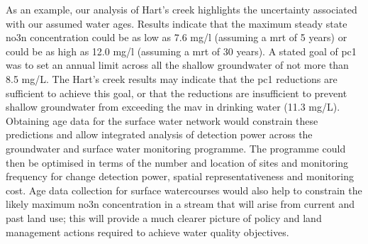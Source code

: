 As an example, our analysis of Hart's creek highlights the uncertainty associated with our assumed water ages.
Results indicate that the maximum steady state \gls{no3n} concentration could be as low as 7.6 mg/l (assuming a \gls{mrt} of 5 years) or could be as high as 12.0 mg/l (assuming a \gls{mrt} of 30 years).
A stated goal of \gls{pc1} was to set an annual limit across all the shallow groundwater of not more than 8.5 mg/L.
The Hart's creek results may indicate that the \gls{pc1} reductions are sufficient to achieve this goal, or that the reductions are insufficient to prevent shallow groundwater from exceeding the \gls{mav} in drinking water (11.3 mg/L).
Obtaining age data for the surface water network would constrain these predictions and allow integrated analysis of detection power across the groundwater and surface water monitoring programme.
The programme could then be optimised in terms of the number and location of sites and monitoring frequency for change detection power, spatial representativeness and monitoring cost.
Age data collection for surface watercourses would also help to constrain the likely maximum \gls{no3n} concentration in a stream that will arise from current and past land use; this will provide a much clearer picture of policy and land management actions required to achieve water quality objectives.

